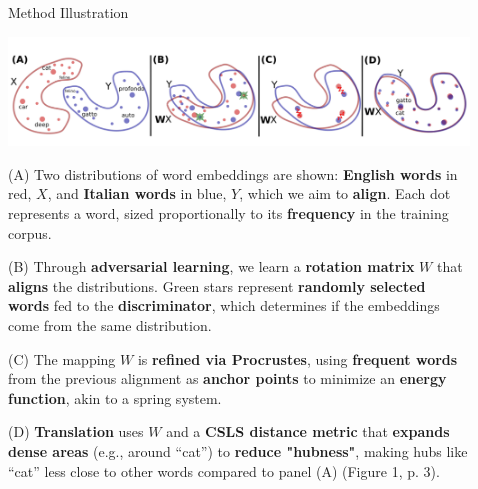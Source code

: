 \documentclass[final]{beamer}
\newlength{\sepwid}
\newlength{\onecolwid}
\newlength{\twocolwid}
\begin{document}
\begin{frame}[t]
\begin{columns}[t]
\begin{column}{\onecolwid}
\end{column} 

\begin{column}{\sepwid}\end{column} 

\begin{column}{\twocolwid}



\begin{block}{Method Illustration}
\begin{center}
    \includegraphics[width=1.0\linewidth, height=0.25\textheight]{figures/figure1.png}
\end{center}
(A) Two distributions of word embeddings are shown: \textbf{English words} in red, \(X\), and \textbf{Italian words} in blue, \(Y\), which we aim to \textbf{align}. Each dot represents a word, sized proportionally to its \textbf{frequency} in the training corpus. 

(B) Through \textbf{adversarial learning}, we learn a \textbf{rotation matrix} \(W\) that \textbf{aligns} the distributions. Green stars represent \textbf{randomly selected words} fed to the \textbf{discriminator}, which determines if the embeddings come from the same distribution. 

(C) The mapping \(W\) is \textbf{refined via Procrustes}, using \textbf{frequent words} from the previous alignment as \textbf{anchor points} to minimize an \textbf{energy function}, akin to a spring system. 

(D) \textbf{Translation} uses \(W\) and a \textbf{CSLS distance metric} that \textbf{expands dense areas} (e.g., around “cat”) to \textbf{reduce "hubness"}, making hubs like “cat” less close to other words compared to panel (A) (Figure 1, p. 3).

\normalsize
\end{block}


\end{column}
\end{columns}
\end{frame}
\end{document}
